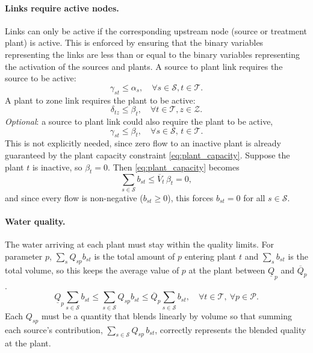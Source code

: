 \documentclass[10pt]{article}
\begin{document}
\paragraph{Links require active nodes.} Links can only be active if the corresponding upstream node (source or treatment plant) is active. This is enforced by ensuring that the binary variables representing the links are less than or equal to the binary variables representing the activation of the sources and plants.
A source to plant link requires the source to be active:
\begin{equation}
    \gamma_{st} \le \alpha_s, \quad \forall s \in \mathcal{S}, t \in \mathcal{T}.
\end{equation}
A plant to zone link requires the plant to be active:
\begin{equation}
    \delta_{tz} \le \beta_t,  \quad \forall t \in \mathcal{T}, z \in \mathcal{Z}.
\end{equation}
\emph{Optional}: a source to plant link could also require the plant to be active,
\begin{equation}
    \gamma_{st} \le \beta_t, \quad \forall s \in \mathcal{S},\, t \in \mathcal{T}.
\end{equation}
This is not explicitly needed, since zero flow to an inactive plant is already guaranteed by the plant capacity constraint \eqref{eq:plant_capacity}. Suppose the plant $t$ is inactive, so $\beta_t = 0$. Then \eqref{eq:plant_capacity} becomes
\begin{equation*}
    \sum_{s \in \mathcal{S}} b_{st} \le \overline{V}_t\,\beta_t = 0,
\end{equation*}
and since every flow is non-negative ($b_{st} \ge 0$), this forces $b_{st} = 0$ for all $s \in \mathcal{S}$.

\paragraph{Water quality.} The water arriving at each plant must stay within the quality limits. For parameter $p$, $\sum_s Q_{sp} b_{st}$ is the total amount of $p$ entering plant $t$ and $\sum_s b_{st}$ is the total volume, so this keeps the average value of $p$ at the plant between $\underline{Q}_p$ and $\overline{Q}_p$.
\begin{equation}\label{eq:general_water_quality}
    \underline{Q}_p \sum_{s \in \mathcal{S}} b_{st}
    \le \sum_{s \in \mathcal{S}} Q_{sp}b_{st}
    \le \overline{Q}_p \sum_{s \in \mathcal{S}} b_{st},
    \quad \forall t \in \mathcal{T},\ \forall p \in \mathcal{P}.
\end{equation}
Each $Q_{sp}$ must be a quantity that blends linearly by volume so that summing each source's contribution, $\sum_{s \in \mathcal{S}} Q_{sp}\,b_{st}$, correctly represents the blended quality at the plant.
\end{document}
